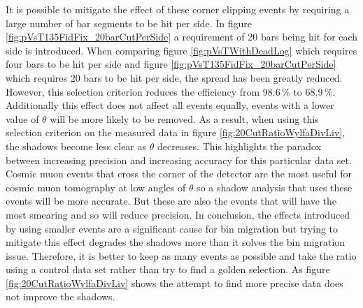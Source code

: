 

It is possible to mitigate the effect of these corner clipping events by requiring a large number of bar segments to be hit per side. In figure \ref{fig:pVsT135FidFix_20barCutPerSide} a requirement of 20 bars being hit for each side is introduced. When comparing figure \ref{fig:pVsTWithDeadLog} which requires four bars to be hit per side and figure \ref{fig:pVsT135FidFix_20barCutPerSide} which requires 20 bars to be hit per side, the spread has been greatly reduced. However, this selection criterion reduces the efficiency from 98.6\,\% to 68.9\,\%. Additionally this effect does not affect all events equally, events with a lower value of $\theta$ will be more likely to be removed. As a result, when using this selection criterion on the measured data in figure \ref{fig:20CutRatioWylfaDivLiv}, the shadows become less clear as $\theta$ decreases. This highlights the paradox between increasing precision and increasing accuracy for this particular data set. Cosmic muon events that cross the corner of the detector are the most useful for cosmic muon tomography at low angles of $\theta$ so a shadow analysis that uses these events will be more accurate. But these are also the events that will have the most smearing and so will reduce precision. In conclusion, the effects introduced by using smaller events are a significant cause for bin migration but trying to mitigate this effect degrades the shadows more than it solves the bin migration issue. Therefore, it is better to keep as many events as possible and take the ratio using a control data set rather than try to find a golden selection. As figure \ref{fig:20CutRatioWylfaDivLiv} shows the attempt to find more precise data does not improve the shadows.

